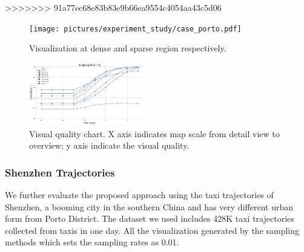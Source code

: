 >>>>>>> 91a77ec68e83b83e9b66ea9554c4054aa43c5d06

\begin{figure}[t]
	\centering
	\vspace{2mm}
	\texttt{[image: pictures/experiment\_study/case\_porto.pdf]}
	\caption{Visualization at dense and sparse region respectively.}
	\vspace{0mm}
	\label{fig:porto}
\end{figure}

\begin{figure}[t]
	\centering
	\vspace{2mm}
	\includegraphics[width=0.45\textwidth]{pictures/experiment_study/quanlity.png}
	\caption{Visual quality chart. X axis indicates map scale from detail view to overview; y axis indicate the visual quality. }
	\vspace{0mm}
	\label{fig:quality_chart}
\end{figure}


\subsubsection{Shenzhen Trajectories}
We further evaluate the proposed approach using the taxi trajectories of Shenzhen, a booming city in the southern China and has very different urban form from Porto District. The dataset we used includes 428K taxi trajectories collected from \QM{**} taxis in one day. All the visualization generated by the sampling methods which sets the sampling rates as 0.01.

